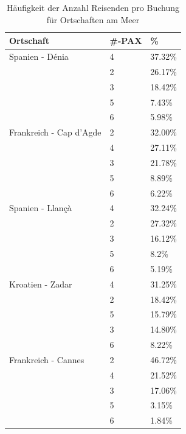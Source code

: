 \begin{table}[H] 
	\caption{Häufigkeit der Anzahl Reisenden pro Buchung für Ortschaften am Meer}
	\centering
	\label{sec:testingfazit:testing:hypothesen:2}
	\begin{tabular}{ | l | l | l | } 
		\hline 
		\rowcolor{tableheadcolor}
		\bfseries Ortschaft & \bfseries \#-PAX & \bfseries \% \\ \hline 
		Spanien - Dénia & 4 & 37.32\% \\ \cline{2-3} 
		 & 2 & 26.17\% \\ \cline{2-3}
		 & 3 & 18.42\% \\ \cline{2-3} 
		 & 5 & 7.43\% \\ \cline{2-3}
		 & 6 & 5.98\% \\ \hline 
		Frankreich - Cap d'Agde & 2 & 32.00\% \\ \cline{2-3} 
		 & 4 & 27.11\% \\ \cline{2-3}
		 & 3 & 21.78\% \\ \cline{2-3} 
		 & 5 & 8.89\% \\ \cline{2-3}
		 & 6 & 6.22\% \\ \hline 
		Spanien - Llançà & 4 & 32.24\% \\ \cline{2-3}
		& 2 & 27.32\% \\ \cline{2-3} 
		& 3 & 16.12\% \\ \cline{2-3}
		& 5 & 8.2\% \\ \cline{2-3}
		& 6 & 5.19\% \\ \hline 
		Kroatien - Zadar & 4 & 31.25\% \\ \cline{2-3}
		& 2 & 18.42\% \\ \cline{2-3} 
		& 5 & 15.79\% \\ \cline{2-3}
		& 3 & 14.80\% \\ \cline{2-3}
		& 6 & 8.22\% \\ \hline 
		Frankreich - Cannes & 2 & 46.72\% \\ \cline{2-3} 
		& 4 & 21.52\% \\ \cline{2-3}
		& 3 & 17.06\% \\ \cline{2-3} 
		& 5 & 3.15\% \\ \cline{2-3}
		& 6 & 1.84\% \\ \hline 
	\end{tabular}
\end{table}

